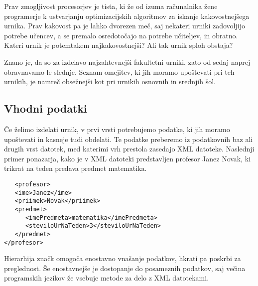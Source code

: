\documentclass[a4paper,10pt]{article}
\begin{document}
Prav zmogljivost procesorjev je tista, ki že od izuma računalnika žene programerje k
ustvarjanju optimizacijskih algoritmov za iskanje kakovostnejšega urnika. Prav kakovost
pa je lahko dvorezen meč, saj nekateri urniki zadovoljijo potrebe učencev, a se premalo
osredotočajo na potrebe učiteljev, in obratno. Kateri urnik je potemtakem najkakovostnejši?
Ali tak urnik sploh obstaja?

Znano je, da so za izdelavo najzahtevnejši fakultetni urniki, zato od sedaj naprej
obravnavamo le slednje. Seznam omejitev, ki jih moramo upoštevati pri teh urnikih,
je namreč obsežnejši kot pri urnikih osnovnih in srednjih šol.

\subsection{Vhodni podatki} %

Če želimo izdelati urnik, v prvi vrsti potrebujemo podatke, ki jih moramo upoštevati in
kasneje tudi obdelati. Te podatke preberemo iz podatkovnih baz ali drugih vrst datotek,
med katerimi vrh prestola zasedajo XML datoteke. Naslednji primer ponazarja, kako je v
XML datoteki predstavljen profesor Janez Novak, ki trikrat na teden predava predmet
matematika.


\begin{verbatim}
   <profesor>
   <ime>Janez</ime>
   <priimek>Novak</priimek>
   <predmet>
      <imePredmeta>matematika</imePredmeta>
      <steviloUrNaTeden>3</steviloUrNaTeden>
   </predmet>
</profesor>
\end{verbatim}
%
Hierarhija značk omogoča enostavno vnašanje podatkov, hkrati pa poskrbi za preglednost.
Še enostavnejše je dostopanje do posameznih podatkov, saj večina programskih jezikov že
vsebuje metode za delo z XML datotekami.
\end{document}
